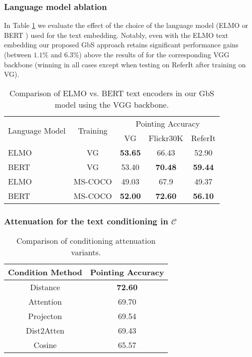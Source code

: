 \documentclass[10pt,twocolumn,letterpaper]{article}
\def\oursspace{{GbS }}
\newcommand\secvspace{\vspace{-0.0cm}}
\newcommand\figvspace{\vspace{-0.2cm}}
\begin{document}
\secvspace
\subsubsection{Language model ablation}\label{sec:abl_lang}
In Table \ref{tab:lang_model_supp} we evaluate the effect of the choice of the language model (ELMO \cite{peters2018deep} or BERT \cite{devlin2018bert}) used for the text embedding. 
Notably, even with the ELMO text embedding our proposed \oursspace approach retains significant performance gains (between $1.1\%$ and $6.3\%$) above the results of \cite{akbari2019multi} for the corresponding VGG backbone (winning in all cases except when testing on ReferIt after training on VG).
\begin{table}[h]
\begin{center}
\begin{tabular}{ lcccc }
\toprule
 \multirow{2}{*}{Language Model} & \multirow{2}{*}{Training} & \multicolumn{3}{c}{ Pointing Accuracy}\\
   &  & VG & Flickr30K & ReferIt\\ 
 \midrule ELMO & VG & \textbf{53.65} & 66.43 & 52.90 \\
 BERT & VG & 53.40 & \textbf{70.48} & \textbf{59.44}\\
 \midrule
 ELMO & MS-COCO & 49.03 & 67.9 & 49.37 \\
 BERT & MS-COCO & \textbf{52.00} & \textbf{72.60} & \textbf{56.10} \\
\end{tabular}
\end{center}
\caption{Comparison of ELMO vs. BERT text encoders in our \oursspace model using the VGG backbone.
}
\figvspace
\label{tab:lang_model_supp}
\end{table}
 
\secvspace
\subsubsection{Attenuation for the text conditioning in $\mathcal{C}$}\label{sec:abl_cond}
\secvspace
\begin{table}
\begin{center}
\begin{tabular}{ c| c}
Condition Method & Pointing Accuracy\\
 \hline
 Distance & \textbf{72.60}\\
 Attention & 69.70  \\
 Projecton &  69.54\\
 Dist2Atten & 69.43 \\
 Cosine & 65.57 
\end{tabular}
\end{center}
\caption{Comparison of conditioning attenuation variants.}
\figvspace
\label{tab:cond_ablation}
\end{table}
\end{document}
